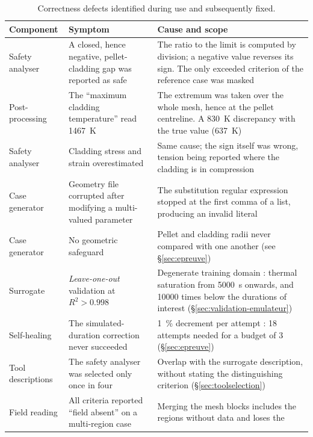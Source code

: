 \begin{table}[htbp]
\centering
\caption[Correctness defects identified]{Correctness defects identified during
use and subsequently fixed.}
\label{tab:bugs}
\small
\begin{tabularx}{\textwidth}{@{}>{\raggedright\arraybackslash}p{3.3cm}XX@{}}
\toprule
\textbf{Component} & \textbf{Symptom} & \textbf{Cause and scope}\\
\midrule
Safety analyser & A closed, hence negative, pellet-cladding gap was reported as
  safe & The ratio to the limit is computed by division; a negative value
  reverses its sign. The only exceeded criterion of the reference case was
  masked\\
\addlinespace
Post-processing & The ``maximum cladding temperature'' read
  \SI{1467}{\kelvin} & The extremum was taken over the whole mesh, hence at the
  pellet centreline. A \SI{830}{\kelvin} discrepancy with the true value
  (\SI{637}{\kelvin})\\
\addlinespace
Safety analyser & Cladding stress and strain overestimated & Same cause; the
  sign itself was wrong, tension being reported where the cladding is in
  compression\\
\addlinespace
Case generator & Geometry file corrupted after modifying a multi-valued
  parameter & The substitution regular expression stopped at the first comma of
  a list, producing an invalid literal\\
\addlinespace
Case generator & No geometric safeguard & Pellet and cladding radii never
  compared with one another (see §\ref{sec:epreuve})\\
\addlinespace
Surrogate & \textit{Leave-one-out} validation at $R^2 > 0.998$ & Degenerate
  training domain : thermal saturation from \SI{5000}{\second} onwards, and
  \num{10000} times below the durations of interest
  (§\ref{sec:validation-emulateur})\\
\addlinespace
Self-healing & The simulated-duration correction never succeeded &
  \SI{1}{\percent} decrement per attempt : \num{18} attempts needed for a budget
  of \num{3} (§\ref{sec:epreuve})\\
\addlinespace
Tool descriptions & The safety analyser was selected only once in four &
  Overlap with the surrogate description, without stating the distinguishing
  criterion (§\ref{sec:toolselection})\\
\addlinespace
Field reading & All criteria reported ``field absent'' on a multi-region case &
  Merging the mesh blocks includes the regions without data and loses the

\end{tabularx}
\end{table}
